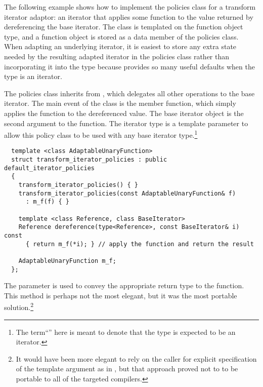 \documentclass{netobjectdays}
\begin{document}
The following example shows how to implement the policies class for a transform
iterator adaptor: an iterator that applies some function to the value returned
by dereferencing the base iterator.  The
 class is templated on the function
object type, and a function object is stored as a data member of the policies
class. When adapting an underlying iterator, it is easiest to store any extra state
needed by the resulting adapted iterator in the policies class rather than
incorporating it into the  type because 
provides so many useful defaults when the  type is an iterator.

The policies class inherits from
, which delegates all other
operations to the base iterator. The main event of the
 class is the
 member function, which simply applies the
function to the dereferenced value. The base iterator object is the
second argument to the  function. The iterator
type is a template parameter to allow this policy class to be used
with any base iterator type.\footnote{The term``''
here is meant to denote that the  type is expected to be an
iterator.}

{\footnotesize
\begin{verbatim}
  template <class AdaptableUnaryFunction>
  struct transform_iterator_policies : public default_iterator_policies
  {
    transform_iterator_policies() { }
    transform_iterator_policies(const AdaptableUnaryFunction& f)
      : m_f(f) { }

    template <class Reference, class BaseIterator>
    Reference dereference(type<Reference>, const BaseIterator& i) const
      { return m_f(*i); } // apply the function and return the result

    AdaptableUnaryFunction m_f;
  };
\end{verbatim}
}

The  parameter is used to convey the appropriate return
type to the  function. This method is perhaps not the most
elegant, but it was the most portable solution.\footnote{It would have been more
elegant to rely on the caller for explicit specification of the 
template argument as in
, but that approach
proved not to to be portable to all of the targeted compilers.}
\end{document}
